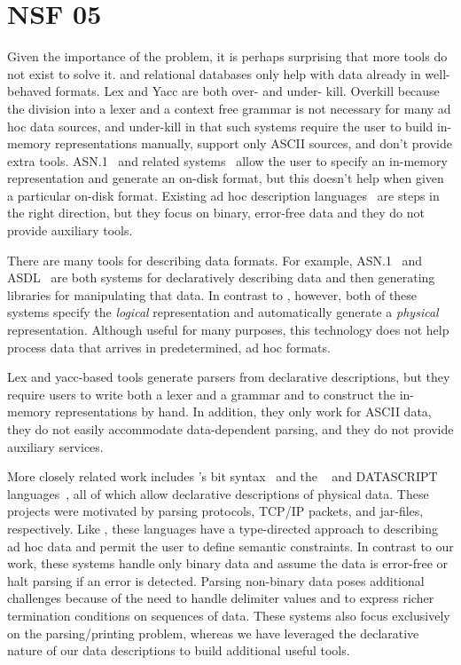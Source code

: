 %

%

\section{NSF 05}

Given the importance of the problem, it is perhaps surprising that
more tools do not exist to solve it.  \xml{} and relational databases
only help with data already in well-behaved formats.  Lex and Yacc are
both over- and under- kill.  Overkill because the division into a
lexer and a context free grammar is not necessary for many ad hoc data
sources, and under-kill in that such systems require the user to build
in-memory representations manually, support only ASCII sources, and
don't provide extra tools.  ASN.1~\cite{asn} and related
systems~\cite{asdl} allow the user to specify an in-memory
representation and generate an on-disk format, but this doesn't help
when given a particular on-disk format.  Existing ad hoc description
languages~\cite{gpce02,sigcomm00,erlang} are steps in the right
direction, but they focus on binary, error-free data and they do not
provide auxiliary tools.


There are many tools for describing data formats. For example,
\textsc{ASN.1}~\cite{asn} and \textsc{ASDL}~\cite{asdl} are both
systems for declaratively describing data and then generating
libraries for manipulating that data.  In contrast to \pads{},
however, both of these systems specify the {\em logical\/} representation
and automatically generate a {\em physical\/} representation.
Although useful for many purposes, this technology does not help
process data that arrives in predetermined, ad hoc formats.

Lex and yacc-based tools generate parsers from declarative
descriptions, but they require users to write both a lexer and a
grammar and to construct the in-memory representations by hand.  In
addition, they only work for ASCII data, they do not easily
accommodate data-dependent parsing, and they do not provide auxiliary
services.

More closely related work includes \erlang{}'s bit syntax~\cite{erlang} and
the \packettypes{}~\cite{sigcomm00} and
DATASCRIPT{} languages~\cite{gpce02}, 
all of which allow declarative descriptions of physical data.  These projects were motivated by parsing protocols,
\textsc{TCP/IP} packets, and \java{} jar-files, respectively.  Like
\pads{}, these languages have a type-directed approach to
describing ad hoc data and permit the user to define semantic constraints.
In contrast to our
work, these systems handle only binary data and assume the data is
error-free or halt parsing if an error is detected. 
Parsing non-binary data poses additional challenges because of the need
to handle delimiter values and to express richer termination conditions
on sequences of data. These systems also
focus exclusively on the parsing/printing problem, whereas we have 
leveraged the declarative nature of
our data descriptions to build additional useful tools.


